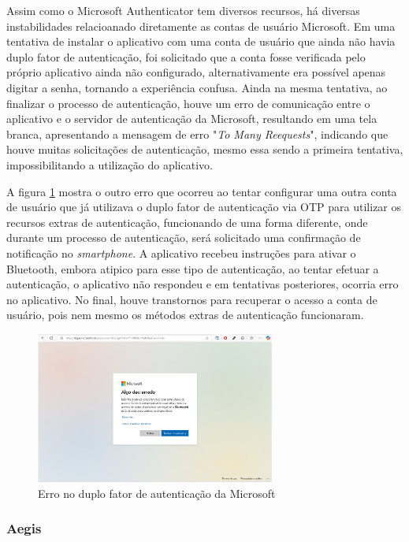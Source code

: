 \documentclass[12pt]{article}
\begin{document}
Assim como o Microsoft Authenticator tem diversos recursos, há diversas instabilidades
relacioanado diretamente as contas de usuário Microsoft.
Em uma tentativa de instalar o aplicativo com uma conta de usuário que ainda não havia
duplo fator de autenticação, foi solicitado que a conta fosse verificada pelo próprio
aplicativo ainda não configurado, alternativamente era possível apenas digitar a senha,
tornando a experiência confusa.
Ainda na mesma tentativa, ao finalizar o processo de autenticação, houve um erro de
comunicação entre o aplicativo e o servidor de autenticação da Microsoft, resultando
em uma tela branca, apresentando a mensagem de erro "\textit{To Many Reequests}",
indicando que houve muitas solicitações de autenticação, mesmo essa sendo a primeira
tentativa, impossibilitando a utilização do aplicativo.

A figura \ref{fig:Microsoft2FactoryAutenticatorError} mostra o outro erro que
ocorreu ao tentar configurar uma outra conta de usuário que já utilizava o duplo fator de
autenticação via OTP para utilizar os recursos extras de autenticação, funcionando de uma forma
diferente, onde durante um processo de autenticação, será solicitado uma confirmação de
notificação no \textit{smartphone}.
A aplicativo recebeu instruções para ativar o Bluetooth, embora atipico para esse tipo
de autenticação, ao tentar efetuar a autenticação, o aplicativo não respondeu e em tentativas
posteriores, ocorria erro no aplicativo.
No final, houve transtornos para recuperar o acesso a conta de usuário, pois nem mesmo os
métodos extras de autenticação funcionaram.

\begin{figure}[h!]
  \centering
  \includegraphics[width=0.7\textwidth]{./assets/microsoft_error_2.png}
  \caption{Erro no duplo fator de autenticação da Microsoft}
  \label{fig:Microsoft2FactoryAutenticatorError}
\end{figure}

\subsubsection{Aegis}
\end{document}
